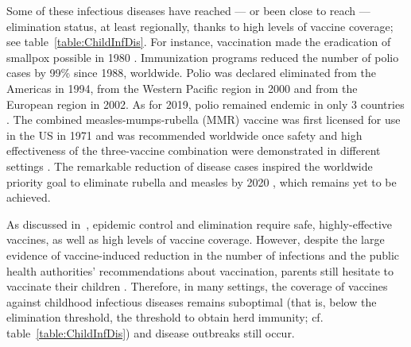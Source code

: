 Some of these infectious diseases have reached --- or been close to reach --- elimination status, at least regionally, thanks to high levels of vaccine coverage; see table~\ref{table:ChildInfDis}. For instance, vaccination made the eradication of smallpox possible in 1980 \cite[]{WHO_SmallpoxEradication1980,CDC_Smallpox2001}. Immunization programs reduced the number of polio cases by 99\% since 1988, worldwide. Polio was declared eliminated from the Americas in 1994, from the Western Pacific region in 2000 and from the European region in 2002. As for 2019, polio remained endemic in only 3 countries \cite[]{WHO_Factsheet_Polio}. The combined measles-mumps-rubella (MMR) vaccine was first licensed for use in the US in 1971 and was recommended worldwide once safety and high effectiveness of the three-vaccine combination were demonstrated in different settings \cite[]{Strebel2013}. The remarkable reduction of disease cases inspired the worldwide priority goal to eliminate rubella and measles by 2020 \cite[]{Andrus2011,WHO_MRPlan2012}, which remains yet to be achieved.

As discussed in~, epidemic control and elimination require safe, highly-effective vaccines, as well as high levels of vaccine coverage. However, despite the large evidence of vaccine-induced reduction in the number of infections and the public health authorities' recommendations about vaccination, parents still hesitate to vaccinate their children \cite[]{Larson2016}. Therefore, in many settings, the coverage of vaccines against childhood infectious diseases remains suboptimal (that is, below the elimination threshold, the threshold to obtain herd immunity; cf. table~\ref{table:ChildInfDis}) and disease outbreaks still occur.

